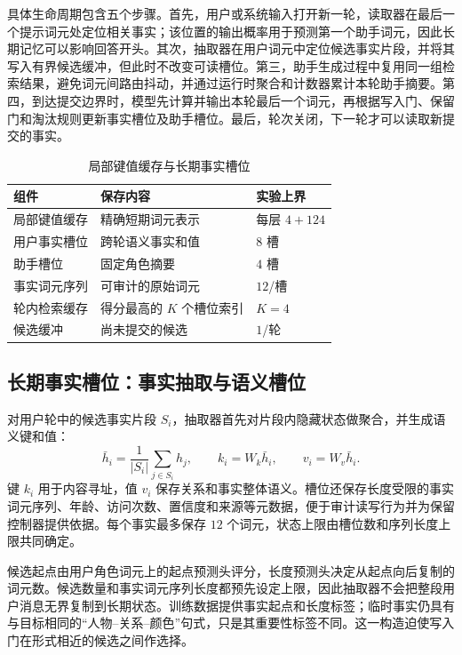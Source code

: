 \documentclass[letterpaper]{article}
\begin{document}
具体生命周期包含五个步骤。首先，用户或系统输入打开新一轮，读取器在最后一个提示词元处定位相关事实；该位置的输出概率用于预测第一个助手词元，因此长期记忆可以影响回答开头。其次，抽取器在用户词元中定位候选事实片段，并将其写入有界候选缓冲，但此时不改变可读槽位。第三，助手生成过程中复用同一组检索结果，避免词元间路由抖动，并通过运行时聚合和计数器累计本轮助手摘要。第四，到达提交边界时，模型先计算并输出本轮最后一个词元，再根据写入门、保留门和淘汰规则更新事实槽位及助手槽位。最后，轮次关闭，下一轮才可以读取新提交的事实。


\begin{table}[t]
\centering
\caption{局部键值缓存与长期事实槽位}
\label{tab:state-components}
\begin{tabular}{lll}
\toprule
组件 & 保存内容 & 实验上界\\
\midrule
局部键值缓存 & 精确短期词元表示 & 每层 $4+124$\\
用户事实槽位 & 跨轮语义事实和值 & $8$ 槽\\
助手槽位 & 固定角色摘要 & $4$ 槽\\
事实词元序列 & 可审计的原始词元 & $12$/槽\\
轮内检索缓存 & 得分最高的 $K$ 个槽位索引 & $K=4$\\
候选缓冲 & 尚未提交的候选 & $1$/轮\\
\bottomrule
\end{tabular}
\end{table}

\subsection{长期事实槽位：事实抽取与语义槽位}

对用户轮中的候选事实片段 $S_i$，抽取器首先对片段内隐藏状态做聚合，并生成语义键和值：
\begin{equation}
\bar{h}_i=\frac{1}{|S_i|}\sum_{j\in S_i}h_j,\qquad
k_i=W_k\bar{h}_i,\qquad v_i=W_v\bar{h}_i.
\end{equation}
键 $k_i$ 用于内容寻址，值 $v_i$ 保存关系和事实整体语义。槽位还保存长度受限的事实词元序列、年龄、访问次数、置信度和来源等元数据，便于审计读写行为并为保留控制器提供依据。每个事实最多保存 $12$ 个词元，状态上限由槽位数和序列长度上限共同确定。

候选起点由用户角色词元上的起点预测头评分，长度预测头决定从起点向后复制的词元数。候选数量和事实词元序列长度都预先设定上限，因此抽取器不会把整段用户消息无界复制到长期状态。训练数据提供事实起点和长度标签；临时事实仍具有与目标相同的“人物--关系--颜色”句式，只是其重要性标签不同。这一构造迫使写入门在形式相近的候选之间作选择。
\end{document}
